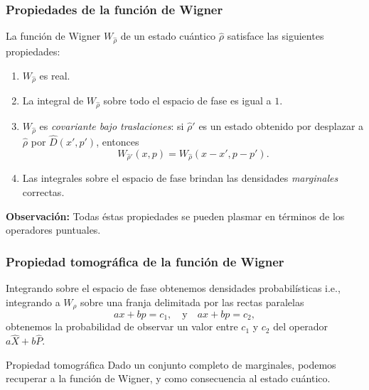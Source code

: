 \documentclass[10pt,spanish]{beamer}
\begin{document}
  \begin{frame}
    \frametitle{Propiedades de la función de Wigner}

    La función de Wigner $W_{\hat\rho}$ de un estado
    cuántico $\hat\rho$ satisface las siguientes
    propiedades:

    \vspace{5pt}

    \begin{enumerate}
      \item $W_{\hat\rho}$ es real.
      \item La integral de $W_{\hat\rho}$ sobre todo el
        espacio de fase es igual a $1$.
      \item $W_{\hat\rho}$ es \textit{covariante bajo
        traslaciones}: si $\hat\rho'$ es un estado obtenido
        por desplazar a $\hat\rho$ por $\hat D(x',p')$,
        entonces
        \begin{equation}
          W_{\hat\rho'}(x,p)
          = W_{\hat\rho}(x-x',p-p').
        \end{equation}
      \item Las integrales sobre el espacio de fase brindan
        las densidades \textit{marginales} correctas.
    \end{enumerate}

    \vspace{3mm}

    \pause

    \textbf{Observación:} Todas éstas propiedades se pueden
    plasmar en términos de los operadores puntuales.
  \end{frame}

  \begin{frame}
    \frametitle{Propiedad tomográfica de la función de
    Wigner}

    Integrando sobre el espacio de fase obtenemos densidades
    probabilísticas i.e., integrando a $W_\rho$ sobre una
    franja delimitada por las rectas paralelas
    \begin{equation*}
      ax+bp=c_1,
      \quad \text{y} \quad ax+bp=c_2,
    \end{equation*}
    obtenemos la probabilidad de observar un valor entre
    $c_1$ y $c_2$ del operador $a \hat X + b \hat P$.

    \vspace{15pt}

    \pause

    \begin{block}{Propiedad tomográfica}
      Dado un conjunto completo de marginales, podemos
      recuperar a la función de Wigner, y como consecuencia
      al estado cuántico.
    \end{block}
    



  \end{frame}
\end{document}
